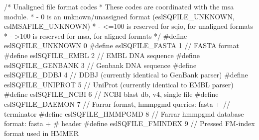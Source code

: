 \begin{cchunk}
/* Unaligned file format codes
 * These codes are coordinated with the msa module.
 *   - 0 is an unknown/unassigned format (eslSQFILE_UNKNOWN, eslMSAFILE_UNKNOWN)
 *   - <=100 is reserved for sqio, for unaligned formats
 *   - >100  is reserved for msa, for aligned formats
 */
#define eslSQFILE_UNKNOWN      0
#define eslSQFILE_FASTA        1   // FASTA format
#define eslSQFILE_EMBL         2   // EMBL DNA sequence
#define eslSQFILE_GENBANK      3   // Genbank DNA sequence
#define eslSQFILE_DDBJ         4   // DDBJ (currently identical to GenBank parser)
#define eslSQFILE_UNIPROT      5   // UniProt (currently identical to EMBL parser) 
#define eslSQFILE_NCBI         6   // NCBI blast db, v4, single file
#define eslSQFILE_DAEMON       7   // Farrar format, hmmpgmd queries: fasta + // terminator 
#define eslSQFILE_HMMPGMD      8   // Farrar hmmpgmd database format: fasta + # header 
#define eslSQFILE_FMINDEX      9   // Pressed FM-index format used in HMMER
\end{cchunk}
